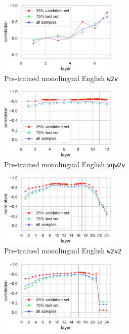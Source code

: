 \documentclass[11pt,a4paper]{article}
\begin{document}
\begin{figure}[ht]
      \begin{subfigure}[b]{0.49\textwidth}
         \centering
         \includegraphics[width=2.2in]{figures/SAA/wav2vec-large.pdf}
         \caption{Pre-trained monolingual English \texttt{w2v}}
         \label{fig:curveW2VSAA}
      \end{subfigure}
      \begin{subfigure}[b]{0.49\textwidth}
         \centering
         \includegraphics[width=2.2in]{figures/SAA/vq-wav2vec.pdf}
         \caption{Pre-trained monolingual English \texttt{vqw2v}}
         \label{fig:curveVQW2VSAA}
     \end{subfigure}
     \par\smallskip
     \begin{subfigure}[b]{0.49\textwidth}
         \centering
         \includegraphics[width=2.2in]{figures/SAA/wav2vec2-large.pdf}
         \caption{Pre-trained monolingual English \texttt{w2v2}}
         \label{fig:curveW2V2SAA}
     \end{subfigure}
     \begin{subfigure}[b]{0.49\textwidth}
         \centering
         \includegraphics[width=2.2in]{figures/SAA/wav2vec2-large-xlsr-53.pdf}

\end{subfigure}
\end{figure}
\end{document}
